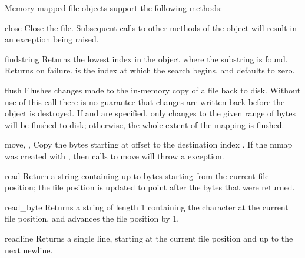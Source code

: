 Memory-mapped file objects support the following methods:


\begin{methoddesc}{close}{}
  Close the file.  Subsequent calls to other methods of the object
  will result in an exception being raised.
\end{methoddesc}

\begin{methoddesc}{find}{string}
  Returns the lowest index in the object where the substring
   is found.  Returns  on failure.  
  is the index at which the search begins, and defaults to zero.
\end{methoddesc}

\begin{methoddesc}{flush}{}
  Flushes changes made to the in-memory copy of a file back to disk.
  Without use of this call there is no guarantee that changes are
  written back before the object is destroyed.  If  and
   are specified, only changes to the given range of bytes
  will be flushed to disk; otherwise, the whole extent of the mapping
  is flushed.
\end{methoddesc}

\begin{methoddesc}{move}{, , }
  Copy the  bytes starting at offset  to the
  destination index .  If the mmap was created with
  , then calls to move will throw a
   exception.
\end{methoddesc}

\begin{methoddesc}{read}{}
  Return a string containing up to  bytes starting from the
  current file position; the file position is updated to point after the
  bytes that were returned.
\end{methoddesc}

\begin{methoddesc}{read_byte}{}
  Returns a string of length 1 containing the character at the current
  file position, and advances the file position by 1.
\end{methoddesc}

\begin{methoddesc}{readline}{}
  Returns a single line, starting at the current file position and up to
  the next newline.
\end{methoddesc}

